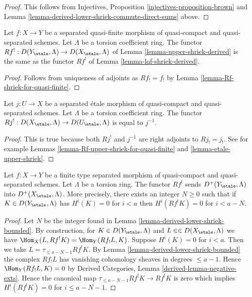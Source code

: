 \begin{proof}
This follows from
Injectives, Proposition \ref{injectives-proposition-brown}
and Lemma \ref{lemma-derived-lower-shriek-commute-direct-sums} above.
\end{proof}

\begin{lemma}
\label{lemma-Rf-upper-shriek-for-quasi-finite}
Let $f : X \to Y$ be a separated quasi-finite morphism of quasi-compact
and quasi-separated schemes. Let $\Lambda$ be a torsion coefficient ring.
The functor $Rf^! : D(Y_\etale, \Lambda) \to D(X_\etale, \Lambda)$
of Lemma \ref{lemma-upper-shriek-derived} is the same as the functor
$Rf^!$ of Lemma \ref{lemma-lqf-shriek-derived}.
\end{lemma}

\begin{proof}
Follows from uniqueness of adjoints as $Rf_! = f_!$ by
Lemma \ref{lemma-Rf-shriek-for-quasi-finite}.
\end{proof}

\begin{lemma}
\label{lemma-Rf-upper-shriek-for-etale}
Let $j : U \to X$ be a separated \'etale morphism of quasi-compact
and quasi-separated schemes. Let $\Lambda$ be a torsion coefficient ring.
The functor $Rj^! : D(X_\etale, \Lambda) \to D(U_\etale, \Lambda)$
is equal to $j^{-1}$.
\end{lemma}

\begin{proof}
This is true because both $Rj^!$ and $j^{-1}$ are right adjoints to
$Rj_! = j_!$. See for example Lemmas
\ref{lemma-Rf-upper-shriek-for-quasi-finite} and
\ref{lemma-etale-upper-shriek}.
\end{proof}

\begin{lemma}
\label{lemma-twisted-inverse-image-bounded-below}
Let $f : X \to Y$ be a finite type separated morphism of
quasi-compact and quasi-separated schemes. Let $\Lambda$ be a torsion
ring. The functor $Rf^!$ sends $D^+(Y_\etale, \Lambda)$ into
$D^+(X_\etale, \Lambda)$. More precisely, there exists an integer
$N \geq 0$ such that if $K \in D(Y_\etale, \Lambda)$ has $H^i(K) = 0$
for $i < a$ then $H^i(Rf^!K) = 0$ for $i < a - N$.
\end{lemma}

\begin{proof}
Let $N$ be the integer found in Lemma \ref{lemma-derived-lower-shriek-bounded}.
By construction, for $K \in D(Y_\etale, \Lambda)$ and
$L \in \in D(X_\etale, \Lambda)$ we have
$\Hom_X(L, Rf^!K) = \Hom_Y(Rf_!L, K)$. Suppose $H^i(K) = 0$
for $i < a$. Then we take $L = \tau_{\leq a - N - 1}Rf^!K$. By
Lemma \ref{lemma-derived-lower-shriek-bounded}
the complex $Rf_!L$ has vanishing cohomology sheaves in
degrees $\leq a - 1$. Hence $\Hom_Y(Rf_!L, K) = 0$ by
Derived Categories, Lemma \ref{derived-lemma-negative-exts}.
Hence the canonical map $\tau_{\leq a - N - 1}Rf^!K \to Rf^!K$
is zero which implies $H^i(Rf^!K) = 0$ for $i \leq a - N - 1$.
\end{proof}

